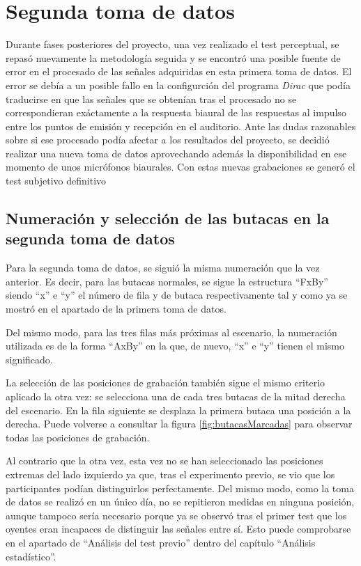 \documentclass[11pt,a4paper,twoside]{book}
\begin{document}
                
            
    \section{Segunda toma de datos}
        Durante fases posteriores del proyecto, una vez realizado el test perceptual, se repasó nuevamente la metodología seguida y se encontró una posible fuente de error en el procesado de las señales adquiridas en esta primera toma de datos. El error se debía a un posible fallo en la configurción del programa \textit{Dirac} que podía traducirse en que las señales que se obtenían tras el procesado no se correspondieran exáctamente a la respuesta biaural de las respuestas al impulso entre los puntos de emisión y recepción en el auditorio.  Ante las dudas razonables sobre si ese procesado podía afectar a los resultados del proyecto, se decidió realizar una nueva toma de datos aprovechando además la disponibilidad en ese momento de unos micrófonos biaurales. Con estas nuevas grabaciones se generó el test subjetivo definitivo
        
        
       \subsection{Numeración y selección de las butacas en la segunda toma de datos}
            Para la segunda toma de datos, se siguió la misma numeración que la vez anterior. Es decir, para las butacas normales, se sigue la estructura ``FxBy'' siendo ``x'' e ``y'' el número de fila y de butaca respectivamente tal y como ya se mostró en el apartado de la primera toma de datos.
                
            Del mismo modo, para las tres filas más próximas al escenario, la numeración utilizada es de la forma ``AxBy'' en la que, de nuevo, ``x'' e ``y'' tienen el mismo significado.\newline
                
            La selección de las posiciones de grabación también sigue el mismo criterio aplicado la otra vez: se selecciona una de cada tres butacas de la mitad derecha del escenario. En la fila siguiente se desplaza la primera butaca una posición a la derecha. Puede volverse a consultar la figura \ref{fig:butacasMarcadas} para observar todas las posiciones de grabación.
                
            Al contrario que la otra vez, esta vez no se han seleccionado las posiciones extremas del lado izquierdo ya que, tras el experimento previo, se vio que los participantes podían distinguirlos perfectamente. Del mismo modo, como la toma de datos se realizó en un único día, no se repitieron medidas en ninguna posición, aunque tampoco sería necesario porque ya se observó tras el primer test que los oyentes eran incapaces de distinguir las señales entre sí. Esto puede comprobarse en el apartado de ``Análisis del test previo'' dentro del capítulo ``Análisis estadístico''.
                
\end{document}
